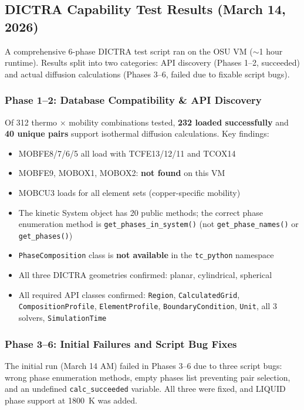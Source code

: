 \documentclass[11pt]{article}
\begin{document}
\subsection{DICTRA Capability Test Results (March 14, 2026)}

A comprehensive 6-phase DICTRA test script ran on the OSU VM ($\sim$1 hour runtime). Results split into two categories: API discovery (Phases 1--2, succeeded) and actual diffusion calculations (Phases 3--6, failed due to fixable script bugs).

\subsubsection{Phase 1--2: Database Compatibility \& API Discovery}

Of 312 thermo $\times$ mobility combinations tested, \textbf{232 loaded successfully} and \textbf{40 unique pairs} support isothermal diffusion calculations. Key findings:

\begin{itemize}[leftmargin=*]
    \item MOBFE8/7/6/5 all load with TCFE13/12/11 and TCOX14
    \item MOBFE9, MOBOX1, MOBOX2: \textbf{not found} on this VM
    \item MOBCU3 loads for all element sets (copper-specific mobility)
    \item The kinetic System object has 20 public methods; the correct phase enumeration method is \texttt{get\_phases\_in\_system()} (not \texttt{get\_phase\_names()} or \texttt{get\_phases()})
    \item \texttt{PhaseComposition} class is \textbf{not available} in the \texttt{tc\_python} namespace
    \item All three DICTRA geometries confirmed: planar, cylindrical, spherical
    \item All required API classes confirmed: \texttt{Region}, \texttt{CalculatedGrid}, \texttt{CompositionProfile}, \texttt{ElementProfile}, \texttt{BoundaryCondition}, \texttt{Unit}, all 3 solvers, \texttt{SimulationTime}
\end{itemize}

\subsubsection{Phase 3--6: Initial Failures and Script Bug Fixes}

The initial run (March 14 AM) failed in Phases 3--6 due to three script bugs: wrong phase enumeration methods, empty phases list preventing pair selection, and an undefined \texttt{calc\_succeeded} variable. All three were fixed, and LIQUID phase support at \SI{1800}{\kelvin} was added.
\end{document}
